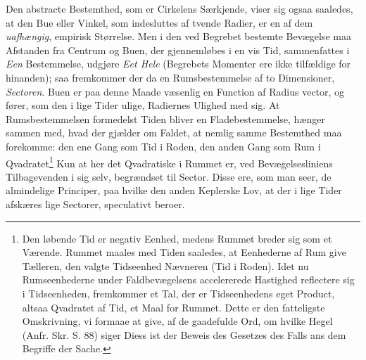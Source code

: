 \documentclass[12pt,a4paper]{book}
\begin{document}
Den abstracte Bestemthed, som er Cirkelens Særkjende, viser sig ogsaa saaledes,
at den Bue eller Vinkel, som indesluttes af tvende Radier, er en af dem
\emph{uafhængig}, empirisk Størrelse. Men i den ved Begrebet bestemte Bevægelse
maa Afstanden fra Centrum og Buen, der gjennemløbes i en vis Tid, sammenfattes
i \emph{Een} Bestemmelse, udgjøre \emph{Eet Hele} (Begrebets Momenter ere ikke
tilfældige for hinanden); saa fremkommer der da en Rumsbestemmelse af to
Dimensioner, \emph{Sectoren}. Buen er paa denne Maade væsenlig en Function af
Radius vector, og fører, som den i lige Tider ulige, Radiernes Ulighed med sig.
At Rumsbestemmelsen formedelst Tiden bliver en Fladebestemmelse, hænger sammen
med, hvad der gjælder om Faldet, at nemlig samme Bestemthed maa forekomme: den
ene Gang som Tid i Roden, den anden Gang som Rum i
Qvadratet\footnote{%
Den løbende Tid er negativ Eenhed, medens Rummet breder sig som et Værende.
Rummet maales med Tiden saaledes, at Eenhederne af Rum give Tælleren, den
valgte Tidseenhed Nævneren (Tid i Roden). Idet nu Rumseenhederne under
Faldbevægelsens accelererede Hastighed reflectere sig i Tidseenheden,
fremkommer et Tal, der er Tidseenhedens eget Product, altsaa Qvadratet af Tid,
et Maal for Rummet. Dette er den fatteligste Omskrivning, vi formaae at give,
af de gaadefulde Ord, om hvilke Hegel (Anfr. Skr. S. 88) siger
Diess ist der Beweis des Gesetzes des Falls ans dem Begriffe der Sache.} Kun at
her det Qvadratiske i Rummet er, ved Bevægelsesliniens Tilbagevenden i sig
selv, begrændset til Sector. Disse ere, som man seer, de almindelige Principer,
paa hvilke den anden Keplerske Lov, at der i lige Tider afskæres lige Sectorer,
speculativt beroer.
\end{document}
